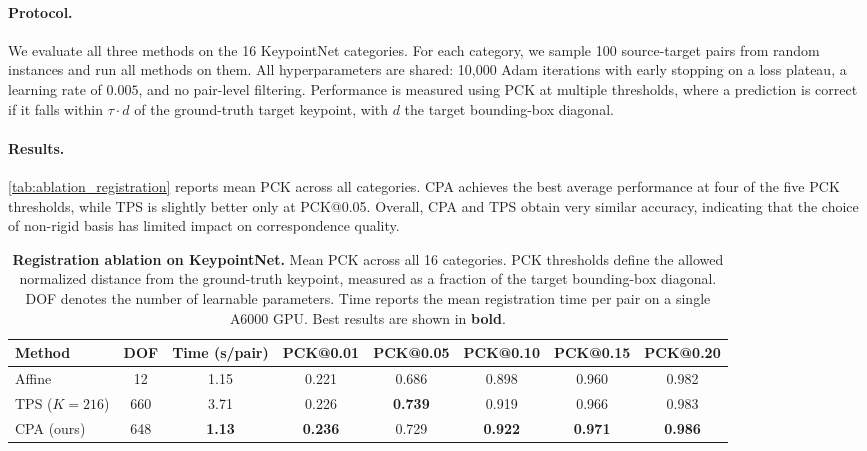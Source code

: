 \paragraph{Protocol.}
We evaluate all three methods on the 16 KeypointNet \cite{you2020} categories. For each category, we sample 100 source-target pairs from random instances and run all methods on them. All hyperparameters are shared: 10,000 Adam iterations with early stopping on a loss plateau, a learning rate of $0.005$, and no pair-level filtering. Performance is measured using PCK at multiple thresholds, where a prediction is correct if it falls within $\tau \cdot d$ of the ground-truth target keypoint, with $d$ the target bounding-box diagonal.

\paragraph{Results.}
\autoref{tab:ablation_registration} reports mean PCK across all categories. CPA achieves the best average performance at four of the five PCK thresholds, while TPS is slightly better only at PCK@0.05. Overall, CPA and TPS obtain very similar accuracy, indicating that the choice of non-rigid basis has limited impact on correspondence quality.

\begin{table}[h!]
\centering
\small
\caption{\textbf{Registration ablation on KeypointNet.}
Mean PCK across all 16 categories. PCK thresholds define the allowed normalized distance from the ground-truth keypoint, measured as a fraction of the target bounding-box diagonal. DOF denotes the number of learnable parameters. Time reports the mean registration time per pair on a single A6000 GPU. Best results are shown in \textbf{bold}.}
\label{tab:ablation_registration}
\setlength{\tabcolsep}{4pt}
\begin{tabular}{lccccccc}
\toprule
Method & DOF & Time (s/pair) & PCK@0.01 & PCK@0.05 & PCK@0.10 & PCK@0.15 & PCK@0.20 \\
\midrule
Affine            & 12  & 1.15 & 0.221 & 0.686 & 0.898 & 0.960 & 0.982 \\
TPS ($K\!=\!216$) & 660 & 3.71 & 0.226 & \textbf{0.739} & 0.919 & 0.966 & 0.983 \\
CPA (ours)        & 648 & \textbf{1.13} & \textbf{0.236} & 0.729 & \textbf{0.922} & \textbf{0.971} & \textbf{0.986} \\
\bottomrule
\end{tabular}
\end{table}

